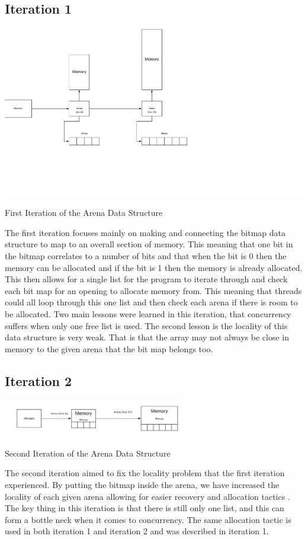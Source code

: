 \documentclass[conference]{IEEEtran}
\begin{document}
\subsection{Iteration 1}
\includegraphics[width=14cm]{iteration1datastructure.jpg}
\caption{First Iteration of the Arena Data Structure}
\label{fig1:Iteration1}
The first iteration focuses mainly on making and connecting the bitmap data structure to map to an overall section of memory. This meaning that one bit in the bitmap correlates to a number of bits and that when the bit is 0 then the memory can be allocated and if the bit is 1 then the memory is already allocated. This then allows for a single list for the program to iterate through and check each bit map for an opening to allocate memory from. This meaning that threads could all loop through this one list and then check each arena if there is room to be allocated. Two main lessons were learned in this iteration, that concurrency suffers when only one free list is used. The second lesson is the locality of this data structure is very weak. That is that the array may not always be close in memory to the given arena that the bit map belongs too. 


\subsection{Iteration 2} 
\includegraphics[width=8cm]{Iteration2datastructure.jpg}
\caption{Second Iteration of the Arena Data Structure}
\label{fig2:Iteration2}
The second iteration aimed to fix the locality problem that the first iteration experienced. By putting the bitmap inside the arena, we have increased the locality of each given arena allowing for easier recovery and allocation tactics \cite{Chatzistergiou}. The key thing in this iteration is that there is still only one list, and this can form a bottle neck when it comes to concurrency. The same allocation tactic is used in both iteration 1 and iteration 2 and was described in iteration 1. 
\end{document}
